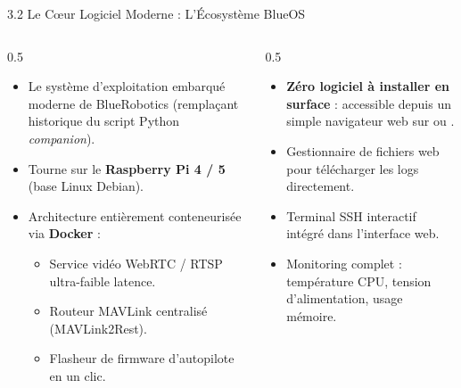 \begin{frame}{3.2 Le C{\oe}ur Logiciel Moderne : L'Écosystème BlueOS}
  \begin{columns}[T]
    \begin{column}{0.5\textwidth}
      \begin{block}{}
        \begin{itemize}
          \item Le système d'exploitation embarqué moderne de BlueRobotics (remplaçant historique du script Python \textit{companion}).
          \item Tourne sur le \textbf{Raspberry Pi 4 / 5} (base Linux Debian).
          \item Architecture entièrement conteneurisée via \textbf{Docker} :
            \begin{itemize}
              \item Service vidéo WebRTC / RTSP ultra-faible latence.
              \item Routeur MAVLink centralisé (MAVLink2Rest).
              \item Flasheur de firmware d'autopilote en un clic.
            \end{itemize}
        \end{itemize}
      \end{block}
    \end{column}

    \begin{column}{0.5\textwidth}
      \begin{block}{}
        \begin{itemize}
          \item \textbf{Zéro logiciel à installer en surface} : accessible depuis un simple navigateur web sur  ou .
          \item Gestionnaire de fichiers web pour télécharger les logs directement.
          \item Terminal SSH interactif intégré dans l'interface web.
          \item Monitoring complet : température CPU, tension d'alimentation, usage mémoire.
        \end{itemize}
      \end{block}
    \end{column}
  \end{columns}
\end{frame}


